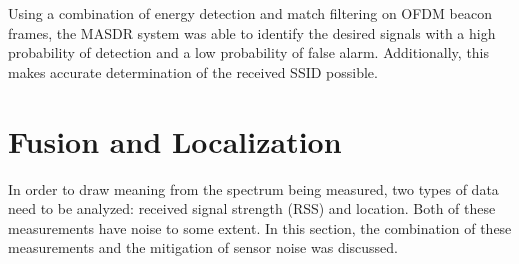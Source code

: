 Using a combination of energy detection and match filtering on OFDM beacon frames, the MASDR system was able to identify the desired signals with a high probability of detection and a low probability of false alarm. Additionally, this makes accurate determination of the received SSID possible.

\section{Fusion and Localization} \label{methods:kf}
In order to draw meaning from the spectrum being measured, two types of data need to be analyzed: received signal strength (RSS) and location. Both of these measurements have noise to some extent. In this section, the combination of these measurements and the mitigation of sensor noise was discussed. \par  

